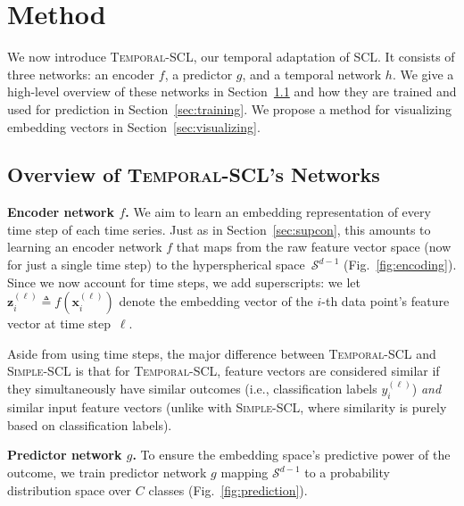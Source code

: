 \documentclass[pmlr,twocolumn,10pt]{jmlr} %
\begin{document}
\vspace{-1em}
\section{Method}
\vspace{-.25em}
We now introduce \textsc{Temporal-SCL}, our temporal adaptation of SCL. It consists of three networks: an encoder $f$, a predictor $g$, and a temporal network $h$. 
We give a high-level overview of these networks in Section~\ref{sec:overview-networks} and how they are trained and used for prediction in Section~\ref{sec:training}. We propose a method for visualizing embedding vectors in Section~\ref{sec:visualizing}.


\vspace{-1em}
\subsection{Overview of \textsc{Temporal-SCL}'s Networks}
\label{sec:overview-networks}
\vspace{-.25em}
 

\noindent
\textbf{Encoder network $f$.}
We aim to learn an embedding representation of every time step of each time series. 
Just as in Section~\ref{sec:supcon}, this amounts to learning an encoder network $f$ that maps from the raw feature vector space (now for just a single time step) to the hyperspherical space~$\mathcal{S}^{d-1}$ (Fig.~\ref{fig:encoding}).
Since we now account for time steps, we add superscripts: we let $\mathbf{z}_i^{(\ell)}\triangleq f(\mathbf{x}_i^{(\ell)})$ denote the embedding vector of the \mbox{$i$-th}  data point's feature vector at time step~$\ell$. 

Aside from using time steps, the major difference between \textsc{Temporal-SCL} and \textsc{Simple-SCL} is that for \textsc{Temporal-SCL}, feature vectors are considered similar if they simultaneously have similar outcomes (i.e., classification labels $y_i^{(\ell)}$) \emph{and} similar input feature vectors (unlike with \textsc{Simple-SCL}, where similarity is purely based on classification labels).

\vspace{.2em}
\noindent
\textbf{Predictor network $g$.}
To ensure the embedding space's predictive power of the outcome, we train predictor network $g$ mapping $\mathcal{S}^{d-1}$ to a probability distribution space over $C$ classes (Fig.~\ref{fig:prediction}).
\end{document}
